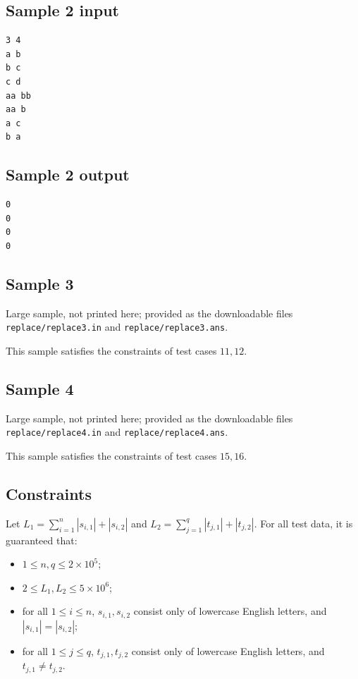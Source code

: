\documentclass[11pt]{article}
\begin{document}
\subsection*{Sample 2 input}

\begin{verbatim}
3 4
a b
b c
c d
aa bb
aa b
a c
b a
\end{verbatim}

\subsection*{Sample 2 output}

\begin{verbatim}
0
0
0
0
\end{verbatim}

\subsection*{Sample 3}

Large sample, not printed here;
provided as the downloadable files \texttt{replace/replace3.in} and \texttt{replace/replace3.ans}.

This sample satisfies the constraints of test cases $11, 12$.

\subsection*{Sample 4}

Large sample, not printed here;
provided as the downloadable files \texttt{replace/replace4.in} and \texttt{replace/replace4.ans}.

This sample satisfies the constraints of test cases $15, 16$.

\subsection*{Constraints}

Let $L_1 = \sum_{i=1}^{n} |s_{i,1}| + |s_{i,2}|$ and
$L_2 = \sum_{j=1}^{q} |t_{j,1}| + |t_{j,2}|$.
For all test data, it is guaranteed that:
\begin{itemize}
\item $1 \le n, q \le 2 \times 10^5$;
\item $2 \le L_1, L_2 \le 5 \times 10^6$;
\item for all $1 \le i \le n$, $s_{i,1}, s_{i,2}$ consist only of lowercase
  English letters, and $|s_{i,1}| = |s_{i,2}|$;
\item for all $1 \le j \le q$, $t_{j,1}, t_{j,2}$ consist only of lowercase
  English letters, and $t_{j,1} \ne t_{j,2}$.
\end{itemize}
\end{document}
